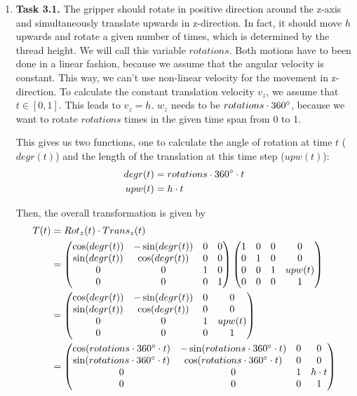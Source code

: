 \documentclass[a4paper,11pt]{article}
\author{\authorinfo}
\title{\titleinfo}
\date{\today}
\begin{document}
\maketitle
\begin {enumerate}
\item[\textbf{Task 3.1.}] The gripper should rotate in positive direction around the z-axis and simultaneously translate upwards in z-direction. In fact, it should move $h$ upwards and rotate a given number of times, which is determined by the thread height. We will call this variable $rotations$. Both motions have to been done in a linear fashion, because we assume that the angular velocity is constant. This way, we can't use non-linear velocity for the movement in z-direction. To calculate the constant translation velocity $v_z$, we assume that $t \in [0,1]$. This leads to $v_z = h$. $w_z$ needs to be $rotations \cdot 360\degree$, because we want to rotate $rotations$ times in the given time span from 0 to 1.

This gives us two functions, one to calculate the angle of rotation at time $t$ ($degr(t)$) and the length of the translation at this time step ($upw(t)$):
\begin{align*}
  degr(t) &= rotations \cdot 360\degree \cdot t\\
  upw(t) &= h \cdot t
\end{align*}

Then, the overall transformation is given by
\begin{align*}
  T(t) &= Rot_{z}(t) \cdot Trans_{z}(t)\\
  &=
    \begin{pmatrix}
      \cos(degr(t)) & -\sin(degr(t)) & 0 & 0\\
      \sin(degr(t)) & \cos(degr(t)) & 0 & 0\\
      0 & 0 & 1 & 0\\
      0 & 0 & 0 & 1
    \end{pmatrix} \begin{pmatrix}
      1 & 0 & 0 & 0\\
      0 & 1 & 0 & 0\\
      0 & 0 & 1 & upw(t)\\
      0 & 0 & 0 & 1
    \end{pmatrix}\\
  &= \begin{pmatrix}
    \cos(degr(t)) & -\sin(degr(t)) & 0 & 0\\
    \sin(degr(t)) & \cos(degr(t)) & 0 & 0\\
    0 & 0 & 1 & upw(t)\\
    0 & 0 & 0 & 1
  \end{pmatrix}\\
  &= \begin{pmatrix}
    \cos(rotations \cdot 360\degree \cdot t) & -\sin(rotations \cdot 360\degree \cdot t) & 0 & 0\\
    \sin(rotations \cdot 360\degree \cdot t) & \cos(rotations \cdot 360\degree \cdot t) & 0 & 0\\
    0 & 0 & 1 & h \cdot t\\
    0 & 0 & 0 & 1
  \end{pmatrix}
\end{align*}



\end{enumerate}
\end{document}
